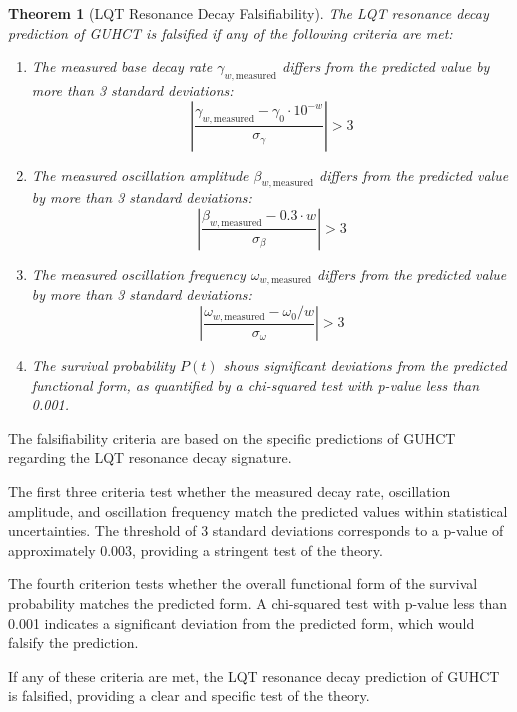 \documentclass[11pt,a4paper]{article}
\makeatletter
\newtheorem{theorem}{Theorem}[section]
\renewenvironment{proof}[1][\proofname]{\par
  \pushQED{\qed}%
  \normalfont \topsep6\p@\@plus6\p@\relax
  \trivlist
  \item[\hskip\labelsep
        \itshape
    #1\@addpunct{.}]\ignorespaces
}{%
  \popQED\endtrivlist\@endpefalse
}
\makeatother
\begin{document}
\begin{theorem}[LQT Resonance Decay Falsifiability]
\label{thm:resonance_falsifiability}
The LQT resonance decay prediction of GUHCT is falsified if any of the following criteria are met:
\begin{enumerate}
    \item The measured base decay rate $\gamma_{w,\text{measured}}$ differs from the predicted value by more than 3 standard deviations:
    \begin{equation}
    \left|\frac{\gamma_{w,\text{measured}} - \gamma_0 \cdot 10^{-w}}{\sigma_{\gamma}}\right| > 3
    \end{equation}
    
    \item The measured oscillation amplitude $\beta_{w,\text{measured}}$ differs from the predicted value by more than 3 standard deviations:
    \begin{equation}
    \left|\frac{\beta_{w,\text{measured}} - 0.3 \cdot w}{\sigma_{\beta}}\right| > 3
    \end{equation}
    
    \item The measured oscillation frequency $\omega_{w,\text{measured}}$ differs from the predicted value by more than 3 standard deviations:
    \begin{equation}
    \left|\frac{\omega_{w,\text{measured}} - \omega_0 / w}{\sigma_{\omega}}\right| > 3
    \end{equation}
    
    \item The survival probability $P(t)$ shows significant deviations from the predicted functional form, as quantified by a chi-squared test with p-value less than 0.001.
\end{enumerate}
\end{theorem}

\begin{proof}
The falsifiability criteria are based on the specific predictions of GUHCT regarding the LQT resonance decay signature.

The first three criteria test whether the measured decay rate, oscillation amplitude, and oscillation frequency match the predicted values within statistical uncertainties. The threshold of 3 standard deviations corresponds to a p-value of approximately 0.003, providing a stringent test of the theory.

The fourth criterion tests whether the overall functional form of the survival probability matches the predicted form. A chi-squared test with p-value less than 0.001 indicates a significant deviation from the predicted form, which would falsify the prediction.

If any of these criteria are met, the LQT resonance decay prediction of GUHCT is falsified, providing a clear and specific test of the theory.
\end{proof}
\end{document}
